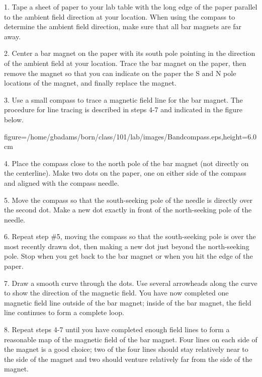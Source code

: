 \item{1.} Tape a sheet of paper to your lab table with
the long edge of the paper parallel to the ambient field
direction at your location.  When using the compass to 
determine the ambient field direction, make sure that 
all bar magnets are far away.

\item{2.} Center a bar magnet on the paper with its 
south pole pointing in the direction of the ambient field
at your location.  Trace the bar magnet on the paper, then
remove the magnet so that you can indicate on the paper
the S and N pole locations of the magnet, and finally
replace the magnet.

\item{3.} Use a small compass to trace a magnetic
field line for the bar magnet.  The procedure for
line tracing is described in steps 4-7 and indicated
in the figure below.
\smallskip
\centerline{\psfig
{figure=/home/gbadams/born/class/101/lab/images/Bandcompass.eps,height=6.0cm}}
\smallskip
\item{4.} Place the compass close to the north pole of the
bar magnet (not directly on the centerline).  Make two dots
on the paper, one on either side of the compass and aligned
with the compass needle.

\item{5.} Move the compass so that the south-seeking pole
of the needle is directly over the second dot.  Make a new
dot exactly in front of the north-seeking pole of the 
needle.

\item{6.} Repeat step \#5, moving the compass so that the
south-seeking pole is over the most recently drawn dot, then
making a new dot just beyond the north-seeking pole.  Stop
when you get back to the bar magnet or when you hit the edge
of the paper.

\item{7.} Draw a smooth curve through the dots.  Use several
arrowheads along the curve to show the direction of the 
magnetic field.  You have now completed one magnetic field
line outside of the bar magnet; inside of the bar magnet,
the field line continues to form a complete loop.

\item{8.} Repeat steps 4-7 until you have completed enough
field lines to form a reasonable map of the magnetic field
of the bar magnet.  Four lines on each side of the magnet
is a good choice; two of the four lines should stay relatively
near to the side of the magnet and two should venture 
relatively far from the side of the magnet.

